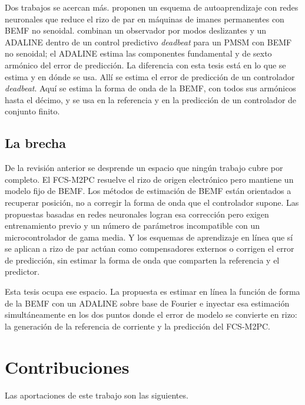 \documentclass[../../../Tesis_JALS_Maestria.tex]{subfiles}
\begin{document}
Dos trabajos se acercan más. \citet{flieller2014selflearning} proponen un esquema de autoaprendizaje con redes neuronales que reduce el rizo de par en máquinas de imanes permanentes con BEMF no senoidal. \citet{guo2024parallel} combinan un observador por modos deslizantes y un ADALINE dentro de un control predictivo \textit{deadbeat} para un PMSM con BEMF no senoidal; el ADALINE estima las componentes fundamental y de sexto armónico del error de predicción. La diferencia con esta tesis está en lo que se estima y en dónde se usa. Allí se estima el error de predicción de un controlador \textit{deadbeat}. Aquí se estima la forma de onda de la BEMF, con todos sus armónicos hasta el décimo, y se usa en la referencia y en la predicción de un controlador de conjunto finito.

\subsection{La brecha}

De la revisión anterior se desprende un espacio que ningún trabajo cubre por completo. El FCS-M2PC resuelve el rizo de origen electrónico pero mantiene un modelo fijo de BEMF. Los métodos de estimación de BEMF están orientados a recuperar posición, no a corregir la forma de onda que el controlador supone. Las propuestas basadas en redes neuronales logran esa corrección pero exigen entrenamiento previo y un número de parámetros incompatible con un microcontrolador de gama media. Y los esquemas de aprendizaje en línea que sí se aplican a rizo de par actúan como compensadores externos o corrigen el error de predicción, sin estimar la forma de onda que comparten la referencia y el predictor.

Esta tesis ocupa ese espacio. La propuesta es estimar en línea la función de forma de la BEMF con un ADALINE sobre base de Fourier e inyectar esa estimación simultáneamente en los dos puntos donde el error de modelo se convierte en rizo: la generación de la referencia de corriente y la predicción del FCS-M2PC.

\section{Contribuciones}
\label{sec:contribuciones}

Las aportaciones de este trabajo son las siguientes.
\end{document}
